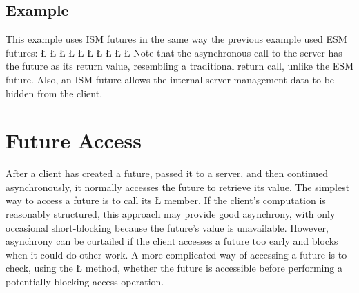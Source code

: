 \documentclass[openright,twoside]{report}
\begin{document}
\subsection{Example}

This example uses ISM futures in the same way the previous example used ESM futures:
\LGinlinefalse\LGbegin\lgrinde
\L{}
\CE{}\L{}
\CE{}\L{}
\CE{}\L{\LB{}}
\CE{}\L{\LB{\}}}
\L{}
\CE{}\L{}
\CE{}\L{\LB{}}
\CE{}\L{\LB{}}
\CE{}\L{\LB{\}}}
\endlgrinde\LGend
Note that the asynchronous call to the server has the future as its return value, resembling a traditional return call, unlike the ESM future.
Also, an ISM future allows the internal server-management data to be hidden from the client.


\section{Future Access}

After a client has created a future, passed it to a server, and then continued asynchronously, it normally accesses the future to retrieve its value.
The simplest way to access a future is to call its \LGinlinetrue\LGbegin\lgrinde\L{}\endlgrinde\LGend{} member.
If the client's computation is reasonably structured, this approach may provide good asynchrony, with only occasional short-blocking because the future's value is unavailable.
However, asynchrony can be curtailed if the client accesses a future too early and blocks when it could do other work.
A more complicated way of accessing a future is to check, using the \LGinlinetrue\LGbegin\lgrinde\L{}\endlgrinde\LGend{} method, whether the future is accessible before performing a potentially blocking access operation.
\end{document}
